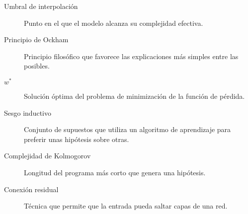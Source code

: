 \begin{description}
  \item[Umbral de interpolación] Punto en el que el modelo alcanza su complejidad efectiva.
  \item[Principio de Ockham] Principio filosófico que favorece las explicaciones más simples entre las posibles.
  \item[$w^{*}$] Solución óptima del problema de minimización de la función de pérdida.
  \item[Sesgo inductivo] Conjunto de supuestos que utiliza un algoritmo de aprendizaje para preferir unas hipótesis sobre otras.
  \item[Complejidad de Kolmogorov] Longitud del programa más corto que genera una hipótesis.
  \item[Conexión residual] Técnica que permite que la entrada pueda saltar capas de una red.
\end{description}

\endinput

